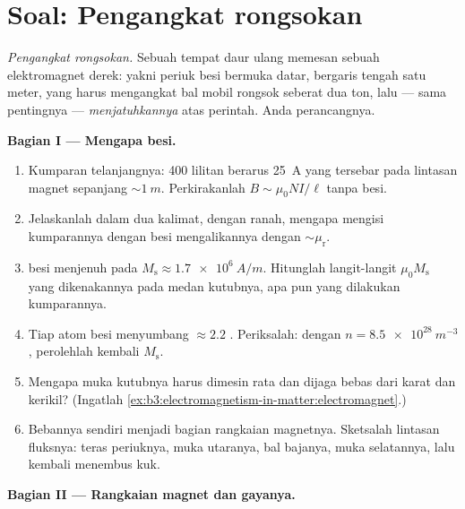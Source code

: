\section{Soal: Pengangkat rongsokan}

\begin{problem}\label{pb:b3:electromagnetism-in-matter:1}
\emph{Pengangkat rongsokan.} Sebuah tempat daur ulang memesan sebuah
elektromagnet derek: yakni periuk besi bermuka datar, bergaris tengah satu
meter, yang harus mengangkat bal mobil rongsok seberat dua ton, lalu ---
sama pentingnya --- \emph{menjatuhkannya} atas perintah. Anda perancangnya.

\medskip\noindent\textbf{Bagian I --- Mengapa besi.}

\begin{enumerate}
  \item Kumparan telanjangnya: 400 lilitan berarus \qty{25}{A} yang
        tersebar pada lintasan magnet sepanjang $\sim\qty{1}{m}$.
        Perkirakanlah $B \sim
        \mu_0NI/\ell$ tanpa besi.
  \item Jelaskanlah dalam dua kalimat, dengan ranah, mengapa mengisi
        kumparannya dengan besi mengalikannya dengan $\sim\mu_{\text{r}}$.
  \item {} besi menjenuh pada $M_{\text{s}} \approx
        \qty{1.7e6}{A/m}$. Hitunglah langit-langit $\mu_0M_{\text{s}}$
        yang dikenakannya pada medan kutubnya, apa pun yang dilakukan kumparannya.
  \item Tiap atom besi menyumbang $\approx 2.2$ .
        Periksalah: dengan $n = \qty{8.5e28}{m^{-3}}$, perolehlah kembali
        $M_{\text{s}}$.
  \item Mengapa muka kutubnya harus dimesin rata dan dijaga bebas dari
        karat dan kerikil? (Ingatlah
        \cref{ex:b3:electromagnetism-in-matter:electromagnet}.)
  \item Bebannya sendiri menjadi bagian rangkaian magnetnya.
        Sketsalah lintasan fluksnya: teras periuknya, muka utaranya, bal
        bajanya, muka selatannya, lalu kembali menembus kuk.
\end{enumerate}

\medskip\noindent\textbf{Bagian II --- Rangkaian magnet dan gayanya.}


\end{problem}
